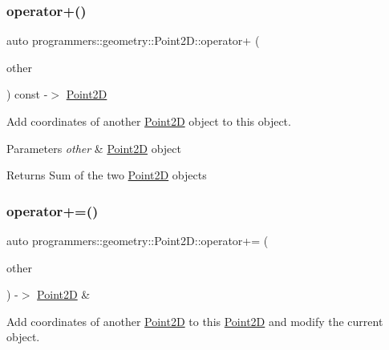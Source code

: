 \subsubsection{\texorpdfstring{operator+()}{operator+()}}
{\footnotesize\ttfamily auto programmers\+::geometry\+::\+Point2\+D\+::operator+ (\begin{DoxyParamCaption}\item[{const \hyperlink{classprogrammers_1_1geometry_1_1Point2D}{Point2D} \&}]{other }\end{DoxyParamCaption}) const -\/$>$  \hyperlink{classprogrammers_1_1geometry_1_1Point2D}{Point2D}}



Add coordinates of another \hyperlink{classprogrammers_1_1geometry_1_1Point2D}{Point2D} object to this object. 


\begin{DoxyParams}{Parameters}
{\em other} & \hyperlink{classprogrammers_1_1geometry_1_1Point2D}{Point2D} object \\
\hline
\end{DoxyParams}
\begin{DoxyReturn}{Returns}
Sum of the two \hyperlink{classprogrammers_1_1geometry_1_1Point2D}{Point2D} objects 
\end{DoxyReturn}
\mbox{\label{classprogrammers_1_1geometry_1_1Point2D_a75796b7e8ddf7b854958d7265f13a2d6}} 
\subsubsection{\texorpdfstring{operator+=()}{operator+=()}}
{\footnotesize\ttfamily auto programmers\+::geometry\+::\+Point2\+D\+::operator+= (\begin{DoxyParamCaption}\item[{const \hyperlink{classprogrammers_1_1geometry_1_1Point2D}{Point2D} \&}]{other }\end{DoxyParamCaption}) -\/$>$  \hyperlink{classprogrammers_1_1geometry_1_1Point2D}{Point2D} \&}



Add coordinates of another \hyperlink{classprogrammers_1_1geometry_1_1Point2D}{Point2D} to this \hyperlink{classprogrammers_1_1geometry_1_1Point2D}{Point2D} and modify the current object. 


